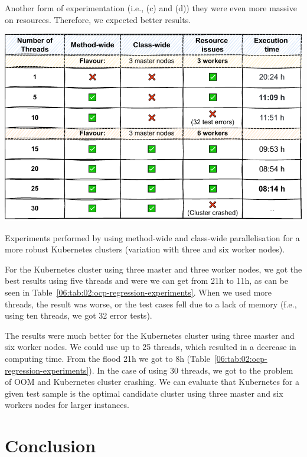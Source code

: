 Another form of experimentation (i.e., (c) and (d)) they were even more massive on resources.
Therefore, we expected better results.
\begin{table}[ht!]
    \centering
    \includegraphics[scale=0.8]{obrazky-figures/08-experiments/regression/06-exp-ocp-regression}
    \caption{Experiments performed by using method-wide and class-wide parallelisation for a more robust Kubernetes
    clusters (variation with three and six worker nodes).}
    \label{06:tab:02:ocp-regression-experiments}
\end{table}
For the Kubernetes cluster using three master and three worker nodes, we got the best results using five threads and were
we can get from 21h to 11h, as can be seen in Table~\ref{06:tab:02:ocp-regression-experiments}.
When we used more threads, the result was worse, or the test cases fell due to a lack of memory (f.e., using
ten threads, we got 32 error tests).

The results were much better for the Kubernetes cluster using three master and six worker nodes.
We could use up to 25 threads, which resulted in a decrease in computing time.
From the flood 21h we got to 8h (Table~\ref{06:tab:02:ocp-regression-experiments}).
In the case of using 30 threads, we got to the problem of OOM and Kubernetes cluster crashing.
We can evaluate that Kubernetes for a given test sample is the optimal candidate
cluster using three master and six workers nodes for larger instances.

\chapter{Conclusion}
\label{08:chapter:title}

